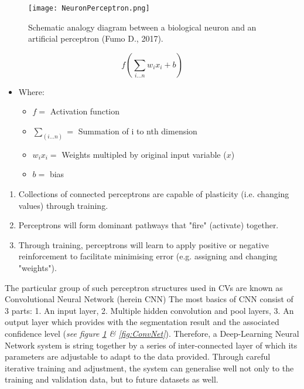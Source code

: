 \documentclass[11pt, a4paper, twoside]{report}
\begin{document}
\begin{figure}[H]
\centering
\texttt{[image: NeuronPerceptron.png]}
  \caption{Schematic analogy diagram between a biological neuron and an artificial perceptron (Fumo D., 2017).}
\label{fig:NeuronPerceptron}
\end{figure}

\begin{equation}
  \label{weights&bias}
  f(\sum_{i ... n} w_{i} x_{i} + b)
\end{equation}

\begin{itemize}
  \item Where:
    \begin{itemize}
      \item $f =$ Activation function
      \item $\sum_{(i ... n)} =$ Summation of i to nth dimension
      \item $w_{i} x_{i} =$ Weights multipled by original input variable ($x$)
      \item $b =$ bias
    \end{itemize}
\end{itemize}

\begin{enumerate}
  \item Collections of connected perceptrons are capable of plasticity (i.e. changing values) through training.
  \item Perceptrons will form dominant pathways that "fire" (activate) together.
  \item Through training, perceptrons will learn to apply positive or negative reinforcement to facilitate minimising error (e.g. assigning and changing "weights").
\end{enumerate}

The particular group of such perceptron structures used in CVs are known as Convolutional Neural Network (herein CNN) The most basics of CNN consist of 3 parts: 1. An input layer, 2. Multiple hidden convolution and pool layers, 3. An output layer which provides with the segmentation result and the associated confidence level (\textit{see figure \ref{fig:NeuronPerceptron} & \ref{fig:ConvNet}}). Therefore, a Deep-Learning Neural Network system is string together by a series of inter-connected layer of which its parameters are adjustable to adapt to the data provided. Through careful iterative training and adjustment, the system can generalise well not only to the training and validation data, but to future datasets as well.\\\par
\end{document}
